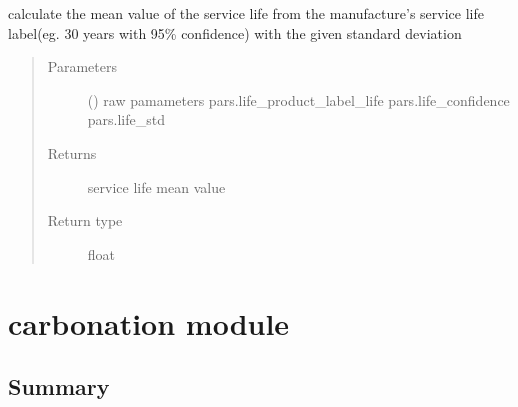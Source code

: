 \documentclass[letterpaper,10pt,english]{sphinxmanual}
\begin{document}

\begin{fulllineitems}
\label{\detokenize{membrane:membrane.membrane_life}}
\sphinxAtStartPar
calculate the mean value of the service life from the manufacture’s service life label(eg. 30 years with 95\% confidence)
with the given standard deviation
\begin{quote}\begin{description}
\item[{Parameters}] \leavevmode
\sphinxAtStartPar
{} () \textendash{} raw pamameters
pars.life\_product\_label\_life
pars.life\_confidence
pars.life\_std

\item[{Returns}] \leavevmode
\sphinxAtStartPar
service life mean value

\item[{Return type}] \leavevmode
\sphinxAtStartPar
float

\end{description}\end{quote}

\end{fulllineitems}



\section{carbonation module}
\label{\detokenize{carbonation:module-carbonation}}\label{\detokenize{carbonation:carbonation-module}}\label{\detokenize{carbonation::doc}}

\subsection{Summary}
\label{\detokenize{carbonation:summary}}
\end{document}

